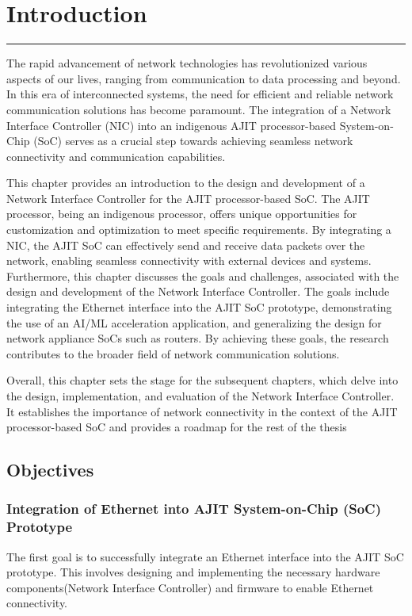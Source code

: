 \documentclass[12pt]{report}
\begin{document}
\chapter{Introduction} \label{1}
\rule[10pt]{\linewidth}{3pt}
 
The rapid advancement of network technologies has revolutionized various aspects of our lives, ranging from communication to data processing and beyond. In this era of interconnected systems, the need for efficient and reliable network communication solutions has become paramount. The integration of a Network Interface Controller (NIC) into an indigenous AJIT processor-based System-on-Chip (SoC) serves as a crucial step towards achieving seamless network connectivity and communication capabilities.

This chapter provides an introduction to the design and development of a Network Interface Controller for the AJIT processor-based SoC. The AJIT processor, being an indigenous processor, offers unique opportunities for customization and optimization to meet specific requirements. By integrating a NIC, the AJIT SoC can effectively send and receive data packets over the network, enabling seamless connectivity with external devices and systems. Furthermore, this chapter discusses the goals and challenges, associated with the design and development of the Network Interface Controller. The goals include integrating the Ethernet interface into the AJIT SoC prototype, demonstrating the use of an AI/ML acceleration application, and generalizing the design for network appliance SoCs such as routers. By achieving these goals, the research contributes to the broader field of network communication solutions. 

Overall, this chapter sets the stage for the subsequent chapters, which delve into the design, implementation, and evaluation of the Network Interface Controller. It establishes the importance of network connectivity in the context of the AJIT processor-based SoC and provides a roadmap for the rest of the thesis



	\section{Objectives}

		\subsection{Integration of Ethernet into AJIT System-on-Chip (SoC) Prototype}
			The first goal is to successfully integrate an Ethernet interface into the AJIT SoC prototype. This involves designing and implementing the necessary hardware components(Network Interface Controller) and firmware to enable Ethernet connectivity.
\end{document}
